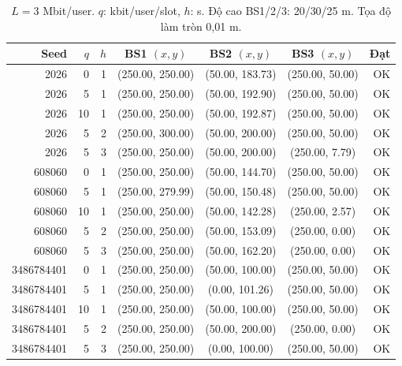 \begin{table}
\centering
\renewcommand{\arraystretch}{1.16}
\setlength{\tabcolsep}{5pt}
\begin{tabular}{rrrcccr}
\toprule
Seed & $q$ & $h$ & BS1 $(x,y)$ & BS2 $(x,y)$ & BS3 $(x,y)$ & Đạt \\
\midrule
2026 & 0 & 1 & (250.00, 250.00) & (50.00, 183.73) & (250.00, 50.00) & OK \\
2026 & 5 & 1 & (250.00, 250.00) & (50.00, 192.90) & (250.00, 50.00) & OK \\
2026 & 10 & 1 & (250.00, 250.00) & (50.00, 192.87) & (250.00, 50.00) & OK \\
2026 & 5 & 2 & (250.00, 300.00) & (50.00, 200.00) & (250.00, 50.00) & OK \\
2026 & 5 & 3 & (250.00, 250.00) & (50.00, 200.00) & (250.00, 7.79) & OK \\
608060 & 0 & 1 & (250.00, 250.00) & (50.00, 144.70) & (250.00, 50.00) & OK \\
608060 & 5 & 1 & (250.00, 279.99) & (50.00, 150.48) & (250.00, 50.00) & OK \\
608060 & 10 & 1 & (250.00, 250.00) & (50.00, 142.28) & (250.00, 2.57) & OK \\
608060 & 5 & 2 & (250.00, 250.00) & (50.00, 153.09) & (250.00, 0.00) & OK \\
608060 & 5 & 3 & (250.00, 250.00) & (50.00, 162.20) & (250.00, 0.00) & OK \\
3486784401 & 0 & 1 & (250.00, 250.00) & (50.00, 100.00) & (250.00, 50.00) & OK \\
3486784401 & 5 & 1 & (250.00, 250.00) & (0.00, 101.26) & (250.00, 50.00) & OK \\
3486784401 & 10 & 1 & (250.00, 250.00) & (50.00, 100.00) & (250.00, 50.00) & OK \\
3486784401 & 5 & 2 & (250.00, 250.00) & (50.00, 200.00) & (250.00, 0.00) & OK \\
3486784401 & 5 & 3 & (250.00, 250.00) & (0.00, 100.00) & (250.00, 50.00) & OK \\
\bottomrule
\end{tabular}
\caption{$L=3$ Mbit/user. $q$: kbit/user/slot, $h$: s. Độ cao BS1/2/3: 20/30/25 m. Tọa độ làm tròn 0,01 m.}
\end{table}

